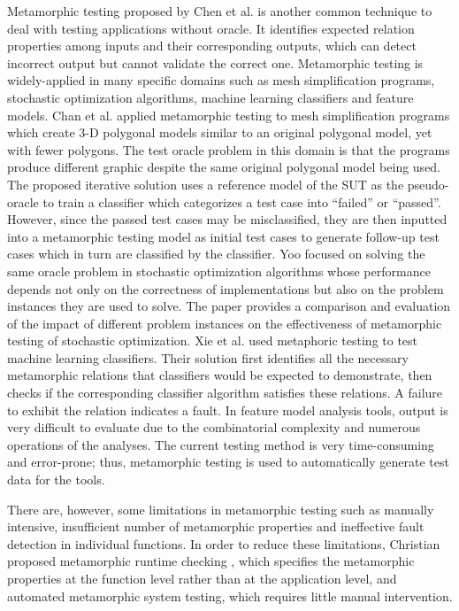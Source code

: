 Metamorphic testing \cite{chen1998metamorphic} proposed by Chen et al. is another common technique to deal with testing applications without oracle. It identifies expected relation properties among inputs and their corresponding outputs,
which can detect incorrect output but cannot validate the correct one. Metamorphic testing is widely-applied in many specific domains such as mesh simplification programs, stochastic optimization algorithms, machine learning classifiers and feature models.
Chan et al. applied metamorphic testing to mesh simplification programs which create 3-D polygonal models similar to an original polygonal model, yet with fewer polygons\cite{Chan:2010:FFP:1815297.1815298, chan2009pat}. The test oracle problem in this domain is that the programs produce different graphic despite the same original polygonal model being used. The proposed iterative solution uses a reference model of the SUT as the pseudo-oracle to train a classifier which categorizes a test case into ``failed'' or ``passed''. However, since the passed test cases may be misclassified, they are then inputted into a metamorphic testing model as initial test cases to generate follow-up test cases which in turn are classified by the classifier.
Yoo \cite{Yoo:2010:MTS:1799526.1799581} focused on solving the same oracle problem in stochastic optimization algorithms whose performance depends not only on the correctness of implementations but also on the problem instances they are used to solve. The paper provides a comparison and evaluation of the impact of different problem instances on the effectiveness of metamorphic testing of stochastic optimization.
Xie et al. \cite{Xie:2011:TVM:1942318.1942371} used metaphoric testing to test machine learning classifiers. Their solution first identifies all the necessary metamorphic relations that classifiers would be expected to demonstrate, then checks if the corresponding classifier algorithm satisfies these relations. A failure to exhibit the relation indicates a fault.
In feature model analysis tools, output is very difficult to evaluate due to the combinatorial complexity and numerous operations of the analyses. The current testing method is very time-consuming and error-prone; thus, metamorphic testing is used to automatically generate test data for the tools.

There are, however, some limitations in metamorphic testing such as manually intensive, insufficient number of metamorphic properties and ineffective fault detection in individual functions. In order to reduce these limitations, Christian proposed metamorphic runtime checking \cite{Murphy:2010:MTT:1970820}, which specifies the metamorphic properties at the function level rather than at the application level, and automated metamorphic system testing, \cite{Murphy:2009:AST:1572272.1572295} which requires little manual intervention.

